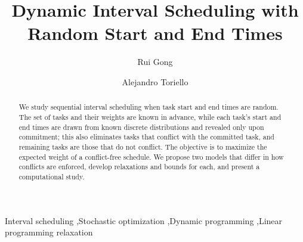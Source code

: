 \documentclass[final,5p,times,twocolumn]{elsarticle}
\begin{document}
\begin{frontmatter}


\title{Dynamic Interval Scheduling with Random Start and End Times}

\author[gatech]{Rui Gong}

\author[gatech]{Alejandro Toriello}


\begin{abstract}
We study sequential interval scheduling when task start and end times are random.
The set of tasks and their weights are known in advance, while each task's start and end times are drawn from known discrete distributions and revealed only upon commitment;
this also eliminates tasks that conflict with the committed task, and remaining tasks are those that do not conflict.
The objective is to maximize the expected weight of a conflict-free schedule.
We propose two models that differ in how conflicts are enforced, develop relaxations and bounds for each, and present a computational study.
\end{abstract}



\begin{keyword}
Interval scheduling \sep Stochastic optimization \sep Dynamic programming \sep Linear programming relaxation
\end{keyword}

\end{frontmatter}
\end{document}
